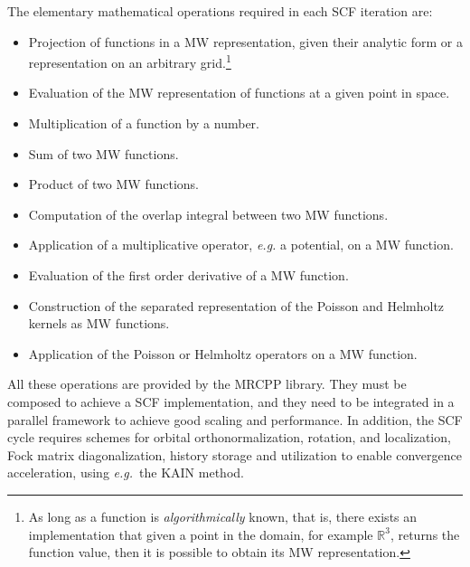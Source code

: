 \documentclass[journal=jctcce, manuscript=article]{achemso}
\begin{document}
The elementary mathematical operations required in each SCF iteration are:
\begin{itemize}
\item Projection of functions in a \ac{MW} representation, given their analytic form or a representation on an arbitrary grid.\footnote{As long as a function is \emph{algorithmically} known, that is, there exists an implementation that given a point in the domain, for example $\mathbb{R}^{3}$, returns the function value, then it is possible to obtain its \ac{MW} representation.} 
\item Evaluation of the \ac{MW} representation of functions at a given point in space.
\item Multiplication of a function by a number.
\item Sum of two \ac{MW} functions.
\item Product of two \ac{MW} functions.
\item Computation of the overlap integral between two \ac{MW} functions.
\item Application of a multiplicative operator, \emph{e.g.} a potential, on a \ac{MW} function.
\item Evaluation of the first order derivative of a \ac{MW} function.
\item Construction of the separated representation of the Poisson and Helmholtz kernels as \ac{MW} functions.
\item Application of the Poisson or Helmholtz operators on a \ac{MW} function.
\end{itemize}

All these operations are provided by the MRCPP library\cite{mrcpp}. They must be composed to achieve a \ac{SCF} implementation, and they need to be integrated in a parallel framework to achieve good scaling and performance. In addition, the \ac{SCF} cycle requires schemes for orbital orthonormalization, rotation, and localization, Fock matrix diagonalization, history storage and utilization to enable convergence acceleration, using \emph{e.g.}~the \ac{KAIN} method.~\cite{Harrison2004-fs}
\end{document}

